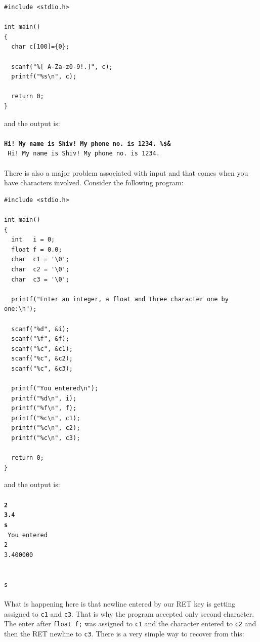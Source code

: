 \begin{verbatim}
#include <stdio.h>

int main()
{
  char c[100]={0};

  scanf("%[ A-Za-z0-9!.]", c);
  printf("%s\n", c);

  return 0;
}
\end{verbatim}

and the output is:
\\\\\texttt{\textbf{Hi! My name is Shiv! My phone no. is 1234. \%\^\$\&\*\\}
Hi! My name is Shiv! My phone no. is 1234.\\\\}
There is also a major problem associated with input and that comes when you
have characters involved. Consider the following program:

\begin{verbatim}
#include <stdio.h>

int main()
{
  int   i = 0;
  float f = 0.0;
  char  c1 = '\0';
  char  c2 = '\0';
  char  c3 = '\0';

  printf("Enter an integer, a float and three character one by one:\n");

  scanf("%d", &i);
  scanf("%f", &f);
  scanf("%c", &c1);
  scanf("%c", &c2);
  scanf("%c", &c3);

  printf("You entered\n");
  printf("%d\n", i);
  printf("%f\n", f);
  printf("%c\n", c1);
  printf("%c\n", c2);
  printf("%c\n", c3);

  return 0;
}
\end{verbatim}

and the output is:
\\\\\texttt{\textbf{2\\
3.4\\
s\\}
You entered\\
2\\
3.400000\\
\\
\\
s\\\\}
What is happening here is that newline entered by our RET key is getting
assigned to \texttt{c1} and \texttt{c3}. That is why the program accepted only
second character. The enter after \texttt{float f;} was assigned to \texttt{c1}
and the character entered to \texttt{c2} and then the RET newline to
\texttt{c3}. There is a very simple way to recover from this:

